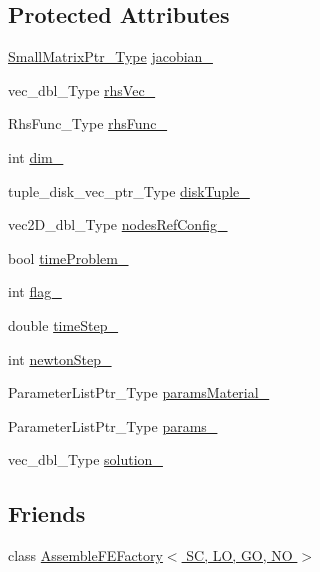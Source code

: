 \subsection*{Protected Attributes}
\begin{DoxyCompactItemize}
\item 
\hyperlink{classFEDD_1_1AssembleFE_afb5fb5dca3aab59f697a25884e99e894}{Small\+Matrix\+Ptr\+\_\+\+Type} \hyperlink{classFEDD_1_1AssembleFE_a12d587892b238ecf6b8fdb0b91c2b0be}{jacobian\+\_\+}
\item 
vec\+\_\+dbl\+\_\+\+Type \hyperlink{classFEDD_1_1AssembleFE_a8eff2b1a9fc0125931206e83e2ab8bbd}{rhs\+Vec\+\_\+}
\item 
Rhs\+Func\+\_\+\+Type \hyperlink{classFEDD_1_1AssembleFE_a2c3232bc8b6d6d9e23ab0a745e103e2a}{rhs\+Func\+\_\+}
\item 
int \hyperlink{classFEDD_1_1AssembleFE_a8419f1d876b0da5f920ab3d1d21e0401}{dim\+\_\+}
\item 
tuple\+\_\+disk\+\_\+vec\+\_\+ptr\+\_\+\+Type \hyperlink{classFEDD_1_1AssembleFE_afd156e8e0ad2ca015a604290919d5794}{disk\+Tuple\+\_\+}
\item 
vec2\+D\+\_\+dbl\+\_\+\+Type \hyperlink{classFEDD_1_1AssembleFE_ab2892bff598d5a4f784d4f30ddf4836c}{nodes\+Ref\+Config\+\_\+}
\item 
bool \hyperlink{classFEDD_1_1AssembleFE_aaa84c5ca06ca8dcd1ad82d7d66ac8e4c}{time\+Problem\+\_\+}
\item 
int \hyperlink{classFEDD_1_1AssembleFE_a222f91cd1b4296d37a520e510692ca8e}{flag\+\_\+}
\item 
double \hyperlink{classFEDD_1_1AssembleFE_aedef52d32fc32f3b70877f705968afcc}{time\+Step\+\_\+}
\item 
int \hyperlink{classFEDD_1_1AssembleFE_a39520c726ee8a6a48258adc555f6df77}{newton\+Step\+\_\+}
\item 
Parameter\+List\+Ptr\+\_\+\+Type \hyperlink{classFEDD_1_1AssembleFE_ac270e80971846b789e7cb2507fe345ba}{params\+Material\+\_\+}
\item 
Parameter\+List\+Ptr\+\_\+\+Type \hyperlink{classFEDD_1_1AssembleFE_a1b7f9f820f3da30ff7dd8438ada14b3b}{params\+\_\+}
\item 
vec\+\_\+dbl\+\_\+\+Type \hyperlink{classFEDD_1_1AssembleFE_a5a0789e00592c0885abac42748c96fd7}{solution\+\_\+}
\end{DoxyCompactItemize}
\subsection*{Friends}
\begin{DoxyCompactItemize}
\item 
class \hyperlink{classFEDD_1_1AssembleFE_a30ff0dcd1d500892033fc319deacb8fb}{Assemble\+F\+E\+Factory$<$ S\+C, L\+O, G\+O, N\+O $>$}
\end{DoxyCompactItemize}


